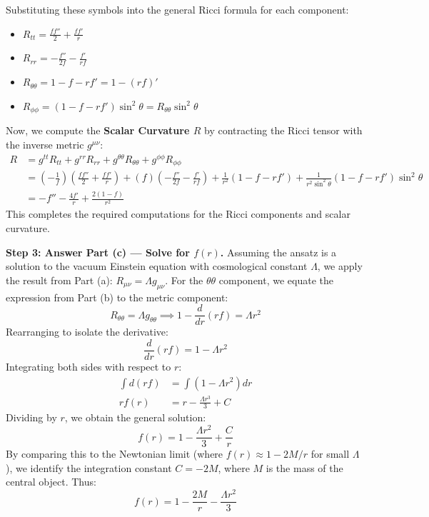 \begin{solution}
Substituting these symbols into the general Ricci formula for each component:
\begin{itemize}
    \item $R_{tt} = \frac{f f''}{2} + \frac{f f'}{r}$
    \item $R_{rr} = -\frac{f''}{2f} - \frac{f'}{rf}$
    \item $R_{\theta\theta} = 1 - f - rf' = 1 - (rf)'$
    \item $R_{\phi\phi} = (1 - f - rf') \sin^2 \theta = R_{\theta\theta} \sin^2 \theta$
\end{itemize}
Now, we compute the \textbf{Scalar Curvature $R$} by contracting the Ricci tensor with the inverse metric $g^{\mu\nu}$:
\begin{align*}
    R &= g^{tt} R_{tt} + g^{rr} R_{rr} + g^{\theta\theta} R_{\theta\theta} + g^{\phi\phi} R_{\phi\phi} \\
      &= \left(-\frac{1}{f}\right) \left(\frac{ff''}{2} + \frac{ff'}{r}\right) + (f) \left(-\frac{f''}{2f} - \frac{f'}{rf}\right) + \frac{1}{r^2}(1-f-rf') + \frac{1}{r^2\sin^2\theta}(1-f-rf')\sin^2\theta \\
      &= -f'' - \frac{4f'}{r} + \frac{2(1-f)}{r^2}
\end{align*}
This completes the required computations for the Ricci components and scalar curvature.

\textbf{Step 3: Answer Part (c) --- Solve for $f(r)$.}
Assuming the ansatz is a solution to the vacuum Einstein equation with cosmological constant $\Lambda$, we apply the result from Part (a): $R_{\mu\nu} = \Lambda g_{\mu\nu}$.
For the $\theta\theta$ component, we equate the expression from Part (b) to the metric component:
\begin{equation*}
    R_{\theta\theta} = \Lambda g_{\theta\theta} \implies 1 - \frac{d}{dr} (rf) = \Lambda r^2
\end{equation*}
Rearranging to isolate the derivative:
\begin{equation*}
    \frac{d}{dr} (rf) = 1 - \Lambda r^2
\end{equation*}
Integrating both sides with respect to $r$:
\begin{align*}
    \int d(rf) &= \int (1 - \Lambda r^2) dr \\
    rf(r) &= r - \frac{\Lambda r^3}{3} + C
\end{align*}
Dividing by $r$, we obtain the general solution:
\begin{equation*}
    f(r) = 1 - \frac{\Lambda r^2}{3} + \frac{C}{r}
\end{equation*}
By comparing this to the Newtonian limit (where $f(r) \approx 1 - 2M/r$ for small $\Lambda$), we identify the integration constant $C = -2M$, where $M$ is the mass of the central object. Thus:
\begin{equation*}
    f(r) = 1 - \frac{2M}{r} - \frac{\Lambda r^2}{3}
\end{equation*}


\end{solution}
